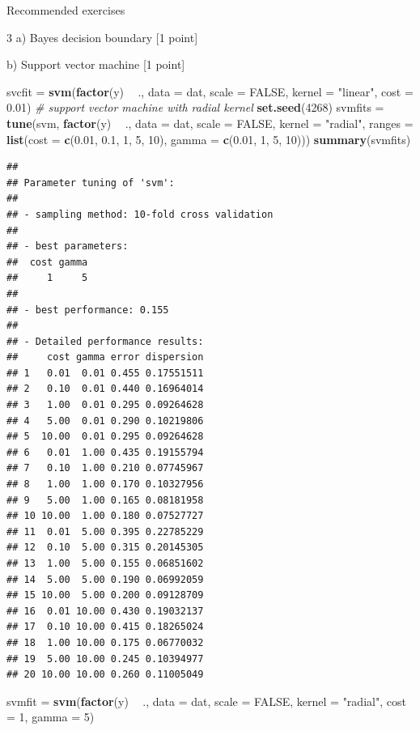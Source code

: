 \documentclass[ignorenonframetext,]{beamer}
\newenvironment{Shaded}{\begin{snugshade}}{\end{snugshade}}
\newcommand{\KeywordTok}[1]{\textcolor[rgb]{0.13,0.29,0.53}{\textbf{#1}}}
\newcommand{\DataTypeTok}[1]{\textcolor[rgb]{0.13,0.29,0.53}{#1}}
\newcommand{\DecValTok}[1]{\textcolor[rgb]{0.00,0.00,0.81}{#1}}
\newcommand{\FloatTok}[1]{\textcolor[rgb]{0.00,0.00,0.81}{#1}}
\newcommand{\StringTok}[1]{\textcolor[rgb]{0.31,0.60,0.02}{#1}}
\newcommand{\CommentTok}[1]{\textcolor[rgb]{0.56,0.35,0.01}{\textit{#1}}}
\newcommand{\OtherTok}[1]{\textcolor[rgb]{0.56,0.35,0.01}{#1}}
\newcommand{\OperatorTok}[1]{\textcolor[rgb]{0.81,0.36,0.00}{\textbf{#1}}}
\newcommand{\NormalTok}[1]{#1}
\begin{document}
\begin{frame}[fragile]{Recommended exercises}
\begin{block}{3 a) Bayes decision boundary {[}1 point{]}}
\begin{block}{b) Support vector machine {[}1 point{]}}
\begin{Shaded}
\begin{Highlighting}[]
\NormalTok{svcfit =}\StringTok{ }\KeywordTok{svm}\NormalTok{(}\KeywordTok{factor}\NormalTok{(y) }\OperatorTok{~}\StringTok{ }\NormalTok{., }\DataTypeTok{data =}\NormalTok{ dat, }\DataTypeTok{scale =} \OtherTok{FALSE}\NormalTok{, }\DataTypeTok{kernel =} \StringTok{"linear"}\NormalTok{, }
    \DataTypeTok{cost =} \FloatTok{0.01}\NormalTok{)}
\CommentTok{# support vector machine with radial kernel}
\KeywordTok{set.seed}\NormalTok{(}\DecValTok{4268}\NormalTok{)}
\NormalTok{svmfits =}\StringTok{ }\KeywordTok{tune}\NormalTok{(svm, }\KeywordTok{factor}\NormalTok{(y) }\OperatorTok{~}\StringTok{ }\NormalTok{., }\DataTypeTok{data =}\NormalTok{ dat, }\DataTypeTok{scale =} \OtherTok{FALSE}\NormalTok{, }\DataTypeTok{kernel =} \StringTok{"radial"}\NormalTok{, }
    \DataTypeTok{ranges =} \KeywordTok{list}\NormalTok{(}\DataTypeTok{cost =} \KeywordTok{c}\NormalTok{(}\FloatTok{0.01}\NormalTok{, }\FloatTok{0.1}\NormalTok{, }\DecValTok{1}\NormalTok{, }\DecValTok{5}\NormalTok{, }\DecValTok{10}\NormalTok{), }\DataTypeTok{gamma =} \KeywordTok{c}\NormalTok{(}\FloatTok{0.01}\NormalTok{, }\DecValTok{1}\NormalTok{, }\DecValTok{5}\NormalTok{, }
        \DecValTok{10}\NormalTok{)))}
\KeywordTok{summary}\NormalTok{(svmfits)}
\end{Highlighting}
\end{Shaded}

\begin{verbatim}
## 
## Parameter tuning of 'svm':
## 
## - sampling method: 10-fold cross validation 
## 
## - best parameters:
##  cost gamma
##     1     5
## 
## - best performance: 0.155 
## 
## - Detailed performance results:
##     cost gamma error dispersion
## 1   0.01  0.01 0.455 0.17551511
## 2   0.10  0.01 0.440 0.16964014
## 3   1.00  0.01 0.295 0.09264628
## 4   5.00  0.01 0.290 0.10219806
## 5  10.00  0.01 0.295 0.09264628
## 6   0.01  1.00 0.435 0.19155794
## 7   0.10  1.00 0.210 0.07745967
## 8   1.00  1.00 0.170 0.10327956
## 9   5.00  1.00 0.165 0.08181958
## 10 10.00  1.00 0.180 0.07527727
## 11  0.01  5.00 0.395 0.22785229
## 12  0.10  5.00 0.315 0.20145305
## 13  1.00  5.00 0.155 0.06851602
## 14  5.00  5.00 0.190 0.06992059
## 15 10.00  5.00 0.200 0.09128709
## 16  0.01 10.00 0.430 0.19032137
## 17  0.10 10.00 0.415 0.18265024
## 18  1.00 10.00 0.175 0.06770032
## 19  5.00 10.00 0.245 0.10394977
## 20 10.00 10.00 0.260 0.11005049
\end{verbatim}

\begin{Shaded}
\begin{Highlighting}[]
\NormalTok{svmfit =}\StringTok{ }\KeywordTok{svm}\NormalTok{(}\KeywordTok{factor}\NormalTok{(y) }\OperatorTok{~}\StringTok{ }\NormalTok{., }\DataTypeTok{data =}\NormalTok{ dat, }\DataTypeTok{scale =} \OtherTok{FALSE}\NormalTok{, }\DataTypeTok{kernel =} \StringTok{"radial"}\NormalTok{, }
    \DataTypeTok{cost =} \DecValTok{1}\NormalTok{, }\DataTypeTok{gamma =} \DecValTok{5}\NormalTok{)}


\end{Highlighting}
\end{Shaded}
\end{block}
\end{block}
\end{frame}
\end{document}
